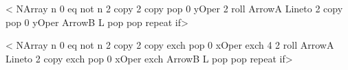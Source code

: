 \def\tx@LineToXAxis{LineToXAxis }

<{%
NArray
n 0 eq not
  { %
    n { 2 copy 2 copy pop 0 \ifPst@ScyBase yOper  2 roll ArrowA Lineto
        2 copy pop 0 \ifPst@ScyBase yOper \fi ArrowB L pop pop
    } repeat
} if}>

\def\psLineToYAxis@ii{%
\addto@pscode{\pst@cp \psline@iii \tx@LineToYAxis}%
\end@OpenObj}
\def\tx@LineToYAxis{LineToYAxis }
<{
NArray
n 0 eq not
  { %
    n { 2 copy 2 copy exch pop 0 \ifPst@ScxBase xOper \fi exch 4 2 roll ArrowA Lineto
        2 copy exch pop 0 \ifPst@ScxBase xOper \fi exch ArrowB L pop pop
    } repeat
} if}>
%
%

